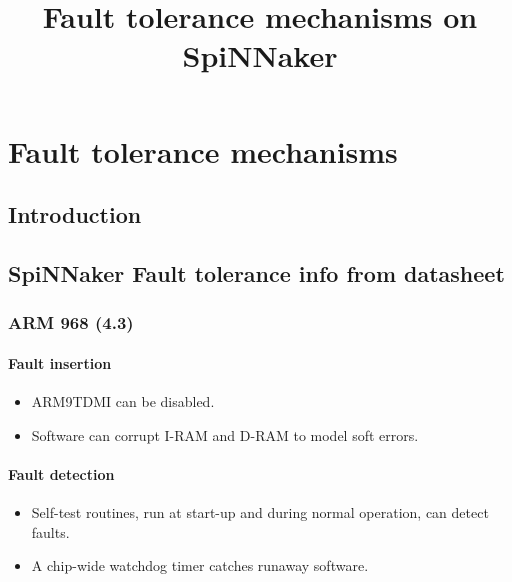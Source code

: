 \documentclass[11pt]{article}
\title{Fault tolerance mechanisms on SpiNNaker}
\newenvironment{itmz}{
	\begin{itemize}
		\setlength{\itemsep}{0pt}
		\setlength{\parskip}{0pt}
	}{\end{itemize}}
\begin{document}
\maketitle


\chapter{Fault tolerance mechanisms}

\section{Introduction}

\section{SpiNNaker Fault tolerance info from datasheet}
\subsection{ARM 968 (4.3)}
\subsubsection*{Fault insertion}
\begin{itmz}
\item ARM9TDMI can be disabled.
\item Software can corrupt I-RAM and D-RAM to model soft errors.
\end{itmz}
\subsubsection*{Fault detection}
\begin{itmz}
\item Self-test routines, run at start-up and during normal operation, can detect faults.
\item A chip-wide watchdog timer catches runaway software.
\end{itmz}
\end{document}
